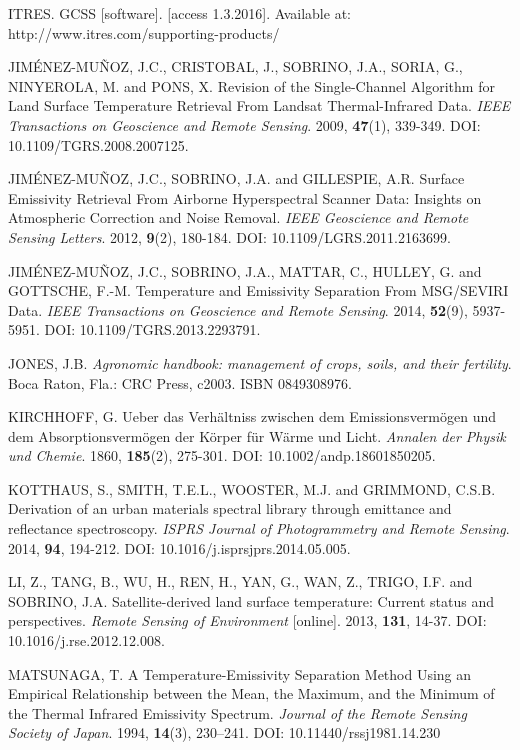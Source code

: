 \begin{thebibliography}{10}
 ITRES. GCSS [software]. [access 1.3.2016]. Available at: http://www.itres.com\linebreak/supporting-products/

 JIMÉNEZ-MUÑOZ, J.C., CRISTOBAL, J., SOBRINO, J.A., SORIA, G., NINYEROLA, M. and PONS, X. Revision of the Single-Channel Algorithm for Land Surface Temperature Retrieval From Landsat Thermal-Infrared Data. \textit{IEEE Transactions on Geoscience and Remote Sensing}. 2009, \textbf{47}(1), 339-349. DOI: 10.1109/TGRS.2008.2007125.

 JIMÉNEZ-MUÑOZ, J.C., SOBRINO, J.A. and GILLESPIE, A.R. Surface Emissivity Retrieval From Airborne Hyperspectral Scanner Data: Insights on Atmospheric Correction and Noise Removal. \textit{IEEE Geoscience and Remote Sensing Letters}. 2012, \textbf{9}(2), 180-184. DOI: 10.1109/LGRS.2011.2163699.

 JIMÉNEZ-MUÑOZ, J.C., SOBRINO, J.A., MATTAR, C., HULLEY, G. and GOTTSCHE, F.-M. Temperature and Emissivity Separation From MSG/SEVIRI Data. \textit{IEEE Transactions on Geoscience and Remote Sensing}. 2014, \textbf{52}(9), 5937-5951. DOI: 10.1109/TGRS.2013.2293791. 

 JONES, J.B. \textit{Agronomic handbook: management of crops, soils, and their fertility}. Boca Raton, Fla.: CRC Press, c2003. ISBN 0849308976.

 KIRCHHOFF, G. Ueber das Verhältniss zwischen dem Emissionsvermögen und dem Absorptionsvermögen der Körper für Wärme und Licht. \textit{Annalen der Physik und Chemie}. 1860, \textbf{185}(2), 275-301. DOI: 10.1002/andp.18601850205.

 KOTTHAUS, S., SMITH, T.E.L., WOOSTER, M.J. and GRIMMOND, C.S.B. Derivation of an urban materials spectral library through emittance and reflectance spectroscopy. \textit{ISPRS Journal of Photogrammetry and Remote Sensing}. 2014, \textbf{94}, 194-212. DOI: 10.1016/j.isprsjprs.2014.05.005.

 LI, Z., TANG, B., WU, H., REN, H., YAN, G., WAN, Z., TRIGO, I.F. and SOBRINO, J.A. Satellite-derived land surface temperature: Current status and perspectives. \textit{Remote Sensing of Environment} [online]. 2013, \textbf{131}, 14-37. DOI: 10.1016/j.rse.2012.12.008.

 MATSUNAGA, T. A Temperature-Emissivity Separation Method Using an Empirical Relationship between the Mean, the Maximum, and the Minimum of the Thermal Infrared Emissivity Spectrum. \textit{Journal of the Remote Sensing Society of Japan}. 1994, \textbf{14}(3), 230–241. DOI: 10.11440/rssj1981.14.230


\end{thebibliography}
